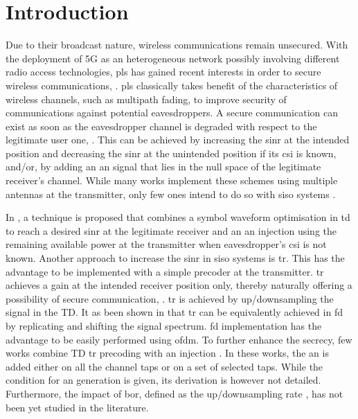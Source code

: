 \section{Introduction}

Due to their broadcast nature, wireless communications remain unsecured. With the  deployment of 5G as an heterogeneous network possibly involving different radio access technologies, \gls{pls} has gained recent interests in order to secure wireless communications, \cite{alves2012performance,yang2012physical,tran2015secrecy}. \gls{pls} classically takes benefit of the characteristics of wireless channels, such as multipath fading, to improve security of communications against potential eavesdroppers. A secure communication can exist as soon as the eavesdropper channel is degraded with respect to the legitimate user one, \cite{wyner1975wire}. This can be achieved by increasing the \gls{sinr} at the intended position and decreasing the \gls{sinr} at the unintended position if its \gls{csi} is known, and/or, by adding an \gls{an} signal that lies in the null space of the legitimate receiver's channel. While many works implement these schemes using multiple antennas at the transmitter, only few ones intend to do so with \gls{siso} systems \cite{li2013waveform,xu2018security,li2018artificial,li2017artificial}.

In \cite{li2013waveform}, a technique is proposed that combines a symbol waveform optimisation in \gls{td} to reach a desired \gls{sinr} at the legitimate receiver and an \gls{an} injection using the remaining available power at the transmitter when eavesdropper's \gls{csi} is not known. Another approach to increase the \gls{sinr} in \gls{siso} systems is \gls{tr}. This has the advantage to be implemented with a simple precoder at the transmitter. \gls{tr} achieves a gain at the intended receiver position only, thereby naturally offering a possibility of secure communication, \cite{oestges2005characterization}. \gls{tr} is achieved by up/downsampling the signal in the TD. It as been shown in  \cite{nguyen2019frequency} that \gls{tr} can be equivalently achieved in \gls{fd} by replicating and shifting the signal spectrum. \gls{fd} implementation has the advantage to be easily performed using \gls{ofdm}. To further enhance the secrecy, few works combine TD \gls{tr} precoding with \gls{an} injection \cite{xu2018security,li2018artificial,li2017artificial}. In these works, the \gls{an} is added either on all the channel taps or on a set of selected taps. While the condition for \gls{an} generation is given, its derivation is however not detailed. Furthermore, the impact of \gls{bor}, defined as the up/downsampling rate \cite{dubois2010use}, has not been yet studied in the literature. 

